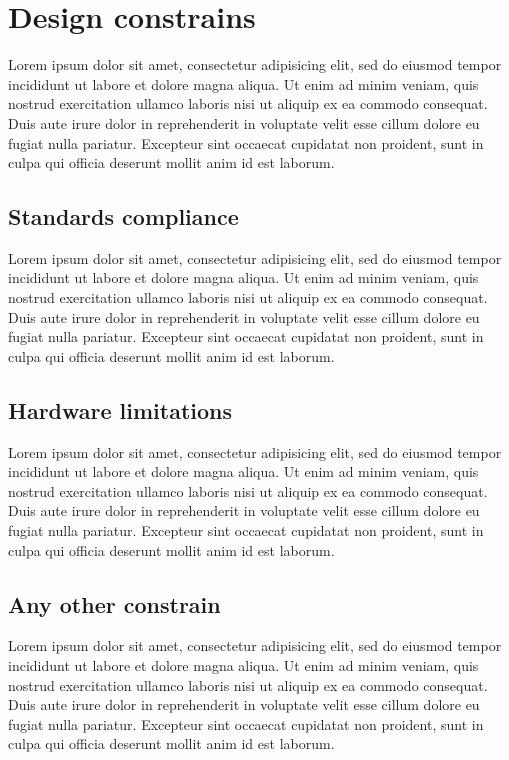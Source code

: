 \documentclass[10pt,a4paper]{report}
\begin{document}
	\section{Design constrains}
	Lorem ipsum dolor sit amet, consectetur adipisicing elit, sed do eiusmod
	tempor incididunt ut labore et dolore magna aliqua. Ut enim ad minim veniam,
	quis nostrud exercitation ullamco laboris nisi ut aliquip ex ea commodo
	consequat. Duis aute irure dolor in reprehenderit in voluptate velit esse
	cillum dolore eu fugiat nulla pariatur. Excepteur sint occaecat cupidatat non
	proident, sunt in culpa qui officia deserunt mollit anim id est laborum.
	
	\subsection{Standards compliance}
	Lorem ipsum dolor sit amet, consectetur adipisicing elit, sed do eiusmod
	tempor incididunt ut labore et dolore magna aliqua. Ut enim ad minim veniam,
	quis nostrud exercitation ullamco laboris nisi ut aliquip ex ea commodo
	consequat. Duis aute irure dolor in reprehenderit in voluptate velit esse
	cillum dolore eu fugiat nulla pariatur. Excepteur sint occaecat cupidatat non
	proident, sunt in culpa qui officia deserunt mollit anim id est laborum.
	
	\subsection{Hardware limitations}
	Lorem ipsum dolor sit amet, consectetur adipisicing elit, sed do eiusmod
	tempor incididunt ut labore et dolore magna aliqua. Ut enim ad minim veniam,
	quis nostrud exercitation ullamco laboris nisi ut aliquip ex ea commodo
	consequat. Duis aute irure dolor in reprehenderit in voluptate velit esse
	cillum dolore eu fugiat nulla pariatur. Excepteur sint occaecat cupidatat non
	proident, sunt in culpa qui officia deserunt mollit anim id est laborum.
	
	\subsection{Any other constrain}
	Lorem ipsum dolor sit amet, consectetur adipisicing elit, sed do eiusmod
	tempor incididunt ut labore et dolore magna aliqua. Ut enim ad minim veniam,
	quis nostrud exercitation ullamco laboris nisi ut aliquip ex ea commodo
	consequat. Duis aute irure dolor in reprehenderit in voluptate velit esse
	cillum dolore eu fugiat nulla pariatur. Excepteur sint occaecat cupidatat non
	proident, sunt in culpa qui officia deserunt mollit anim id est laborum.
	
\end{document}
